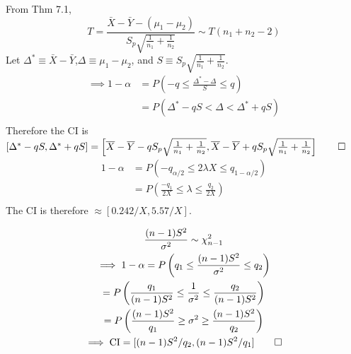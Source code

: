 \documentclass[twocolumn]{article}
\begin{document}
From Thm 7.1, \[
T=\frac{\bar X-\bar Y-(\mu_1-\mu_2)}{S_p\sqrt{\frac{1}{n_1}+\frac{1}{n_2}}}\sim T(n_1+n_2-2)\]
Let $\Delta^*\equiv\bar X-\bar Y$,$\Delta\equiv\mu_1-\mu_2$, and $S\equiv{S_p\sqrt{\frac{1}{n_1}+\frac{1}{n_2}}}$.
\begin{align*}
\implies 1-\alpha&=
P\left(-q\le \frac{\Delta^*-\Delta}{S} \le q\right)\\
&=P\left(\Delta^*-qS<\Delta<\Delta^*+qS\right)\\
\end{align*}
Therefore the CI is $[\Delta^*-qS,\Delta^*+qS]=\left[\bar X-\bar Y-qS_p\sqrt{\frac{1}{n_1}+\frac{1}{n_2}},\bar X-\bar Y+qS_p\sqrt{\frac{1}{n_1}+\frac{1}{n_2}}\right]\qed$
\begin{align*}
1-\alpha&=P(-q_{\alpha/2}\le2\lambda X\le q_{1-\alpha/2})\\
&=P\left(\frac{-q_1}{2X}\le \lambda \le \frac{q_2}{2X}\right)\\
\end{align*}
The CI is therefore $\approx[0.242/X,5.57/X]$.

\begin{gather*}
\frac{(n-1)S^2}{\sigma^2}\sim\chi_{n-1}^2\\
\implies 1-\alpha=P\left(q_1\le \frac{(n-1)S^2}{\sigma^2} \le q_2\right)\\
=P\left( \frac{q_1}{(n-1)S^2} \le \frac{1}{\sigma^2} \le \frac{q_2}{(n-1)S^2} \right)\\
=P\left( \frac{(n-1)S^2}{q_1} \ge \sigma^2 \ge \frac{(n-1)S^2}{q_2} \right)\\
\implies \text{CI}=[(n-1)S^2/q_2,(n-1)S^2/q_1]\qed
\end{gather*}
\end{document}
